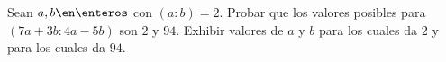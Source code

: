 \begin{enunciado}{\ejercicio}
  Sean $a, b \en \enteros$ con $(a:b) = 2$. Probar que los valores posibles para
  $(7a + 3b: 4a - 5b)$ son $2$ y $94$.
  Exhibir valores de $a$ y $b$ para los cuales da $2$ y para los cuales da $94$.
\end{enunciado}

\hacer
